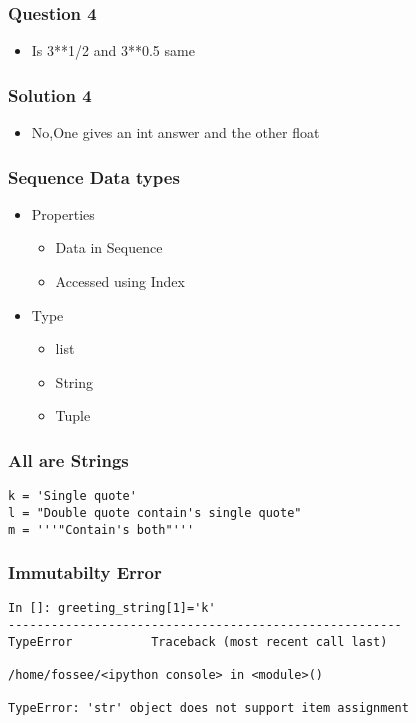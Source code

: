 \documentclass[presentation]{beamer}
\begin{document}
\begin{frame}
\frametitle{Question 4}
\label{sec-10}

\begin{itemize}
\item Is 3**1/2 and 3**0.5 same
\end{itemize}
\end{frame}
\begin{frame}
\frametitle{Solution 4}
\label{sec-11}

\begin{itemize}
\item No,One gives an int answer and the other float
\end{itemize}
\end{frame}
\begin{frame}
\frametitle{Sequence Data types}
\label{sec-12}
\begin{itemize}

\item Properties
\label{sec-12_1}%
\begin{itemize}
\item Data in Sequence
\item Accessed using Index
\end{itemize}


\item Type
\label{sec-12_2}%
\begin{itemize}
\item list
\item String
\item Tuple
\end{itemize}


\end{itemize} %
\end{frame}
\begin{frame}[fragile]
\frametitle{All are Strings}
\label{sec-13}

\begin{verbatim}
k = 'Single quote'
l = "Double quote contain's single quote"
m = '''"Contain's both"'''
\end{verbatim}
\end{frame}
\begin{frame}[fragile]
\frametitle{Immutabilty Error}
\label{sec-14}

\begin{verbatim}
In []: greeting_string[1]='k'
-------------------------------------------------------
TypeError           Traceback (most recent call last)

/home/fossee/<ipython console> in <module>()

TypeError: 'str' object does not support item assignment
\end{verbatim}
\end{frame}
\end{document}
